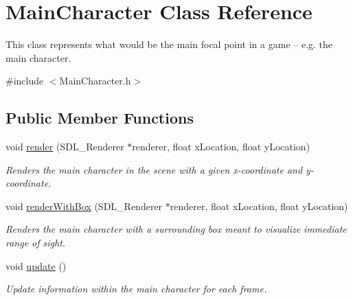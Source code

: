 \hypertarget{class_main_character}{}\section{Main\+Character Class Reference}
\label{class_main_character}


This class represents what would be the main focal point in a game -- e.\+g. the main character.  




{\ttfamily \#include $<$Main\+Character.\+h$>$}

\subsection*{Public Member Functions}
\begin{DoxyCompactItemize}
\item 
\mbox{\label{class_main_character_ade1aa9ae3a0bfbc5c8d8069f39099b23}} 
void \mbox{\hyperlink{class_main_character_ade1aa9ae3a0bfbc5c8d8069f39099b23}{render}} (S\+D\+L\+\_\+\+Renderer $\ast$renderer, float x\+Location, float y\+Location)
\begin{DoxyCompactList}\small\item\em Renders the main character in the scene with a given x-\/coordinate and y-\/coordinate. \end{DoxyCompactList}\item 
\mbox{\label{class_main_character_ab3e4bb87166909a3ffe2aec30434dafb}} 
void \mbox{\hyperlink{class_main_character_ab3e4bb87166909a3ffe2aec30434dafb}{render\+With\+Box}} (S\+D\+L\+\_\+\+Renderer $\ast$renderer, float x\+Location, float y\+Location)
\begin{DoxyCompactList}\small\item\em Renders the main character with a surrounding box meant to visualize immediate range of sight. \end{DoxyCompactList}\item 
\mbox{\label{class_main_character_aecb59107738401c7d5ed79a9281202b9}} 
void \mbox{\hyperlink{class_main_character_aecb59107738401c7d5ed79a9281202b9}{update}} ()
\begin{DoxyCompactList}\small\item\em Update information within the main character for each frame. \end{DoxyCompactList}\item 

\end{DoxyCompactItemize}
